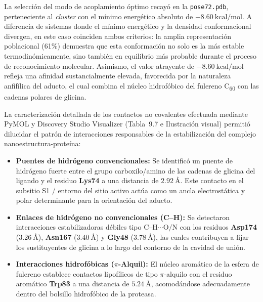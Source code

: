 La selección del modo de acoplamiento óptimo recayó en la \texttt{pose72.pdb}, perteneciente al \textit{cluster} con el mínimo energético absoluto de $-8.60\ \text{kcal/mol}$. A diferencia de sistemas donde el mínimo energético y la densidad conformacional divergen, en este caso coinciden ambos criterios: la amplia representación poblacional (61\%) demuestra que esta conformación no solo es la más estable termodinómicamente, sino también  en equilibrio más probable durante el proceso de reconocimiento molecular. Asimismo, el valor atrayente de $-8.60\ \text{kcal/mol}$ refleja una afinidad sustancialmente elevada, favorecida por la naturaleza anfifílica del aducto, el cual combina el núcleo hidrofóbico del fulereno C\textsubscript{60} con las cadenas polares de glicina.

La caracterización detallada de los contactos no covalentes efectuada mediante PyMOL y Discovery Studio Visualizer (Tabla~9.7 e Ilustración visual) permitió dilucidar el patrón de interacciones responsables de la estabilización del complejo nanoestructura-proteína:

\begin{itemize}
    \item \textbf{Puentes de hidrógeno convencionales:} Se identificó un puente de hidrógeno fuerte entre el grupo carboxilo/amino de las cadenas de glicina del ligando y el residuo \textbf{Lys74} a una distancia de $2.92\ \text{\AA}$. Este contacto en el subsitio S1 / entorno del sitio activo actúa como un ancla electrostática y polar determinante para la orientación del aducto.
    \item \textbf{Enlaces de hidrógeno no convencionales (C--H):} Se detectaron interacciones estabilizadoras débiles tipo $\text{C--H}\cdots\text{O/N}$ con los residuos \textbf{Asp174} ($3.26\ \text{\AA}$), \textbf{Asn167} ($3.40\ \text{\AA}$) y \textbf{Gly48} ($3.78\ \text{\AA}$), las cuales contribuyen a fijar los sustituyentes de glicina a lo largo del contorno de la cavidad de unión.
    \item \textbf{Interacciones hidrofóbicas ($\pi$-Alquil):} El núcleo aromático de la esfera de fulereno establece contactos lipofílicos de tipo $\pi$-alquilo con el residuo aromático \textbf{Trp83} a una distancia de $5.24\ \text{\AA}$, acomodándose adecuadamente dentro del bolsillo hidrofóbico de la proteasa.
\end{itemize}

